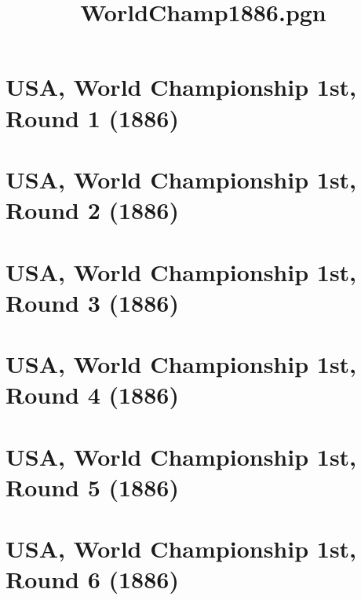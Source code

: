 \documentclass[11pt]{article}
\title{WorldChamp1886.pgn}
\newcommand*\cleartoleftpage{%
   \clearpage
   \ifodd\value{page}\hbox{}\newpage\fi
}
\begin{document}
\maketitle

\newpage

\tableofcontents
\newpage

\printindex

\cleartoleftpage
\section{USA, World Championship 1st, Round 1 (1886)}


\cleartoleftpage

\section{USA, World Championship 1st, Round 2 (1886)}


\cleartoleftpage

\section{USA, World Championship 1st, Round 3 (1886)}


\cleartoleftpage

\section{USA, World Championship 1st, Round 4 (1886)}


\cleartoleftpage

\section{USA, World Championship 1st, Round 5 (1886)}


\cleartoleftpage

\section{USA, World Championship 1st, Round 6 (1886)}

\end{document}
